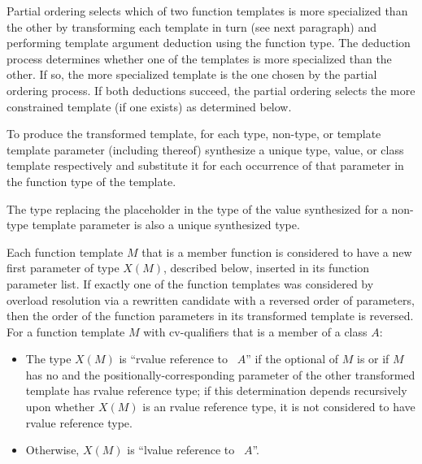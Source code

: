 \pnum
Partial ordering selects which of two function templates is more
specialized than the other by transforming each template in turn
(see next paragraph) and performing template argument deduction
using the function type.
The deduction process determines whether
one of the templates is more specialized than the other. If so, the
more specialized template is the one chosen by the partial ordering
process.
If both deductions succeed, the partial ordering selects
the more constrained template (if one exists) as determined below.

\pnum
To produce the transformed template, for each type, non-type, or template
template parameter (including
thereof) synthesize a unique type, value, or class template
respectively and substitute it for each occurrence of that parameter
in the function type of the template.
\begin{note}
The type replacing the placeholder
in the type of the value synthesized for a non-type template parameter
is also a unique synthesized type.
\end{note}
Each function template $M$ that is a member function
is considered to have
a new first parameter of type $X(M)$, described below,
inserted in its function parameter list.
If exactly one of the function templates was considered by overload resolution
via a rewritten candidate
with a reversed order of parameters,
then the order of the function parameters in its transformed template
is reversed.
For a function template $M$ with cv-qualifiers \cv{}
that is a member of a class $A$:
\begin{itemize}
\item
The type $X(M)$ is ``rvalue reference to \cv{}~$A$''
if the optional  of
$M$ is \tcode{\&\&} or
if $M$ has no  and
the positionally-corresponding parameter of the other transformed template
has rvalue reference type;
if this determination depends recursively upon
whether $X(M)$ is an rvalue reference type,
it is not considered to have rvalue reference type.

\item
Otherwise, $X(M)$ is ``lvalue reference to \cv{}~$A$''.
\end{itemize}


